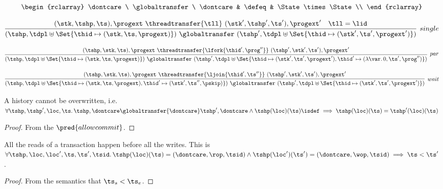 \[
    \begin{rclarray}
        \dontcare \ \globaltransfer \ \dontcare & \defeq & \State \times \State  \\
    \end{rclarray}
\]

\[
    \infer[single]{%
        ( \tshp, \tdpl \uplus \Set{ \thid \mapsto (\stk, \ts, \progext) } ) \ \globaltransfer \  ( \tshp', \tdpl \uplus \Set{ \thid \mapsto (\stk', \ts', \progext') } ) 
    }{%
        ( \stk, \tshp, \ts ) , \progext \ \threadtransfer{\tll} \  ( \stk', \tshp', \ts' ) , \progext' 
        \quad \tll = \lid
    }
\]

\[
    \infer[par]{%
        ( \tshp, \tdpl \uplus \Set{ \thid \mapsto (\stk, \ts, \progext) } ) \ \globaltransfer \  ( \tshp', \tdpl \uplus \Set{ \thid \mapsto (\stk', \ts', \progext'), \thid' \mapsto (\lambda \var \ldotp 0, \ts', \prog'') } )
    }{%
        ( \tshp, \stk, \ts ) , \progext \ \threadtransfer{\lfork{\thid', \prog''}} \  ( \tshp', \stk', \ts' ) , \progext' 
    }
\]

\[
    \infer[wait]{%
        ( \tshp, \tdpl \uplus \Set{ \thid \mapsto (\stk, \ts, \progext), \thid' \mapsto (\stk', \ts'', \pskip) } )  \ \globaltransfer \ ( \tshp', \tdpl \uplus \Set{ \thid \mapsto (\stk', \ts', \progext')} )
    }{%
    ( \tshp, \stk, \ts ) , \progext \ \threadtransfer{\ljoin{\thid',\ts''}} \  ( \tshp', \stk', \ts' ) , \progext' 
    }
\]

\begin{lem}
    A history cannot be overwritten, i.e.\ \( \forall \tshp, \tshp', \loc,\ts \ldotp \tshp, \dontcare \globaltransfer{\dontcare} \tshp', \dontcare \land \tshp(\loc)(\ts)\isdef \implies \tshp(\loc)(\ts) = \tshp'(\loc)(\ts)\)
\end{lem}
\begin{proof}
    From the \( \pred{allowcommit} \).
\end{proof}

\begin{lem}
    \label{lem:read-before-write}
    All the reads of a transaction happen before all the writes. This is 
    \( \forall \tshp, \loc, \loc', \ts, \ts', \tsid \ldotp \tshp(\loc)(\ts) = (\dontcare, \rop, \tsid) \land \tshp(\loc')(\ts') = (\dontcare, \wop, \tsid) \implies \ts < \ts' \).
\end{lem}
\begin{proof}
    From the semantics that \( \ts_{s} < \ts_{e} \).
\end{proof}


